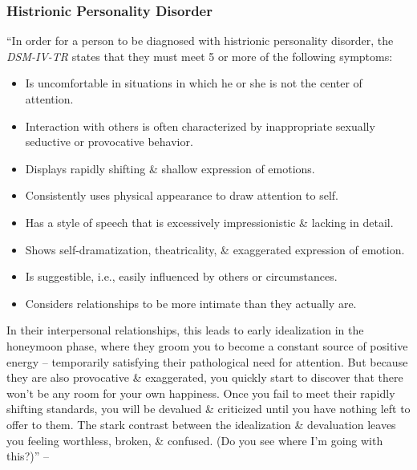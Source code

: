 \documentclass{article}
\numberwithin{equation}{section}
\begin{document}
\subsubsection{Histrionic Personality Disorder}
``In order for a person to be diagnosed with histrionic personality disorder, the \textit{DSM-IV-TR} states that they must meet 5 or more of the following symptoms:
\begin{itemize}
	\item Is uncomfortable in situations in which he or she is not the center of attention.
	\item Interaction with others is often characterized by inappropriate sexually seductive or provocative behavior.
	\item Displays rapidly shifting \& shallow expression of emotions.
	\item Consistently uses physical appearance to draw attention to self.
	\item Has a style of speech that is excessively impressionistic \& lacking in detail.
	\item Shows self-dramatization, theatricality, \& exaggerated expression of emotion.
	\item Is suggestible, i.e., easily influenced by others or circumstances.
	\item Considers relationships to be more intimate than they actually are.
\end{itemize}
In their interpersonal relationships, this leads to early idealization in the honeymoon phase, where they groom you to become a constant source of positive energy -- temporarily satisfying their pathological need for attention. But because they are also provocative \& exaggerated, you quickly start to discover that there won't be any room for your own happiness. Once you fail to meet their rapidly shifting standards, you will be devalued \& criticized until you have nothing left to offer to them. The stark contrast between the idealization \& devaluation leaves you feeling worthless, broken, \& confused. (Do you see where I'm going with this?)'' -- \cite[pp. 195--196]{MacKenzie2015}
\end{document}

